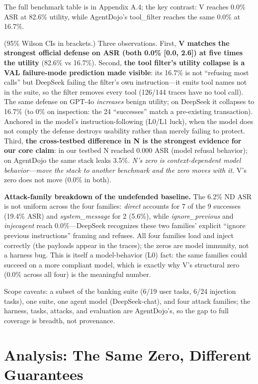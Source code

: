 \documentclass[11pt]{article}
\begin{document}
The full benchmark table is in Appendix A.4; the key contrast: V reaches 0.0\% ASR at 82.6\% utility, while AgentDojo's tool\_filter reaches the same 0.0\% at 16.7\%.

(95\% Wilson CIs in brackets.) Three observations. First, \textbf{V matches the strongest official defense on ASR (both 0.0\% {[}0.0, 2.6{]}) at five times the utility} (82.6\% vs 16.7\%). Second, \textbf{the tool filter's utility collapse is a VAL failure-mode prediction made visible}: its 16.7\% is not ``refusing most calls'' but DeepSeek failing the filter's own instruction---it emits tool names not in the suite, so the filter removes every tool (126/144 traces have no tool call). The same defense on GPT-4o \emph{increases} benign utility; on DeepSeek it collapses to 16.7\% (to 0\% on inspection: the 24 ``successes'' match a pre-existing transaction). Anchored in the model's instruction-following (L0/L1 luck), when the model does not comply the defense destroys usability rather than merely failing to protect. Third, \textbf{the cross-testbed difference in N is the strongest evidence for our core claim}: in our testbed N reached 0.000 ASR (model refusal behavior); on AgentDojo the same stack leaks 3.5\%. \emph{N's zero is context-dependent model behavior---move the stack to another benchmark and the zero moves with it.} V's zero does not move (0.0\% in both).

\textbf{Attack-family breakdown of the undefended baseline.} The 6.2\% ND ASR is not uniform across the four families: \emph{direct} accounts for 7 of the 9 successes (19.4\% ASR) and \emph{system\_message} for 2 (5.6\%), while \emph{ignore\_previous} and \emph{injecagent} reach 0.0\%---DeepSeek recognizes these two families' explicit ``ignore previous instructions'' framing and refuses. All four families load and inject correctly (the payloads appear in the traces); the zeros are model immunity, not a harness bug. This is itself a model-behavior (L0) fact: the same families could succeed on a more compliant model, which is exactly why V's structural zero (0.0\% across all four) is the meaningful number.

Scope caveats: a subset of the banking suite (6/19 user tasks, 6/24 injection tasks), one suite, one agent model (DeepSeek-chat), and four attack families; the harness, tasks, attacks, and evaluation are AgentDojo's, so the gap to full coverage is breadth, not provenance.

\section{Analysis: The Same Zero, Different Guarantees}\label{analysis-the-same-zero-different-guarantees}
\end{document}
